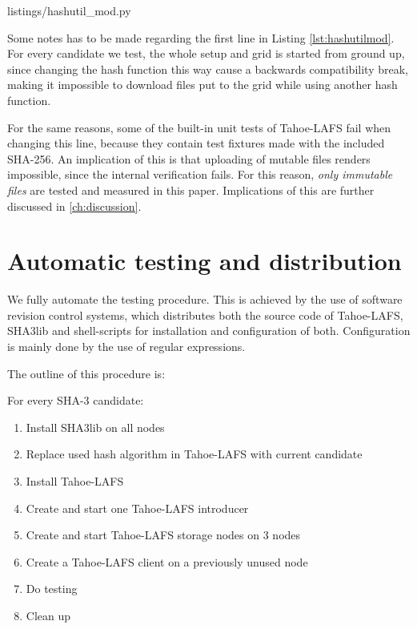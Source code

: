 \documentclass[english,12pt,a4paper]{book}
\begin{document}

{listings/hashutil_mod.py}

Some notes has to be made regarding the first line in Listing
\ref{lst:hashutilmod}. For every candidate we test, the whole setup and grid is
started from ground up, since changing the hash function this way cause a
backwards compatibility break, making it impossible to download files put to the
grid while using another hash function.

For the same reasons, some of the built-in unit tests of Tahoe-LAFS fail when
changing this line, because they contain test fixtures made with the included
SHA-256.  An implication of this is that uploading of mutable files renders
impossible, since the internal verification fails. For this reason, \emph{only
immutable files} are tested and measured in this paper. Implications of this are
further discussed in \autoref{ch:discussion}.

\section{Automatic testing and distribution}
We fully automate the testing procedure. This is achieved by the use of
software revision control systems, which distributes both the source code of
Tahoe-\ac{LAFS}, SHA3lib and shell-scripts for installation and configuration of
both. Configuration is mainly done by the use of regular expressions.

The outline of this procedure is:

\vspace{12pt}
\noindent For every \ac{SHA}-3 candidate:
        \begin{enumerate}
            \item Install SHA3lib on all nodes
            \item Replace used hash algorithm in Tahoe-\ac{LAFS} with current
              candidate
            \item Install Tahoe-\ac{LAFS}
            \item Create and start one Tahoe-\ac{LAFS} introducer
            \item Create and start Tahoe-\ac{LAFS} storage nodes on 3 nodes
            \item Create a Tahoe-\ac{LAFS} client on a previously unused node
            \item Do testing
            \item Clean up
        \end{enumerate}
\end{document}
